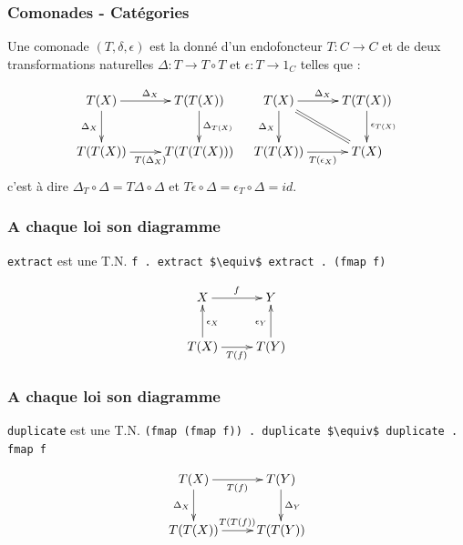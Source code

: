 \documentclass{beamer}
\begin{document}
\begin{frame}
\frametitle{Comonades - Catégories}
Une comonade $(T, \delta, \epsilon)$ est la donné d'un
endofoncteur $T : C \rightarrow C$ et de deux
transformations naturelles $\Delta : T \rightarrow T\circ T$ et $\epsilon : T \rightarrow 1_C$ telles que :

\[
\begin{array}{cc}
\xymatrix{
T(X) \ar[r]^{\Delta_X} \ar[d]_{\Delta_X} & T(T(X)) \ar[d]^{\Delta_{T(X)}} \\
T(T(X)) \ar[r]_{T(\Delta_X)} & T(T(T(X))) \\
}
&
\xymatrix{
T(X) \ar[d]_{\Delta_X} \ar[r]^{\Delta_X}  \ar@{=}[dr] & T(T(X))   \ar[d]^{\epsilon_{T(X)}} \\
T(T(X)) \ar[r]_{T(\epsilon_X)} & T(X) \\
}
\end{array}
\]
c'est à dire
$\Delta_T \circ \Delta = T \Delta \circ \Delta$
et
$T \epsilon \circ \Delta = \epsilon_T \circ \Delta = id$.
\end{frame}

\begin{frame}
\frametitle{A chaque loi son diagramme}
\begin{alertblock}{\verb!extract! est une T.N.}
\verb!f . extract $\equiv$ extract . (fmap f)!
\end{alertblock}

\begin{block}{}
\[
\xymatrix{
X \ar[r]^{f} & Y  \\
T(X) \ar[r]_{T(f)} \ar[u]_{\epsilon_X} & T(Y) \ar[u]^{\epsilon_Y}\\
}
\]
\end{block}

\end{frame}

\begin{frame}
\frametitle{A chaque loi son diagramme}
\begin{alertblock}{\verb!duplicate! est une T.N.}
\verb!(fmap (fmap f)) . duplicate $\equiv$ duplicate . fmap f!
\end{alertblock}

\begin{block}{}
\[
\xymatrix{
T(X) \ar[r]_{T(f)} \ar[d]_{\Delta_{X}} & T(Y) \ar[d]^{\Delta_{Y}} \\
T(T(X)) \ar[r]^{T(T(f))} & T(T(Y)) \\
}
\]
\end{block}

\end{frame}
\end{document}
